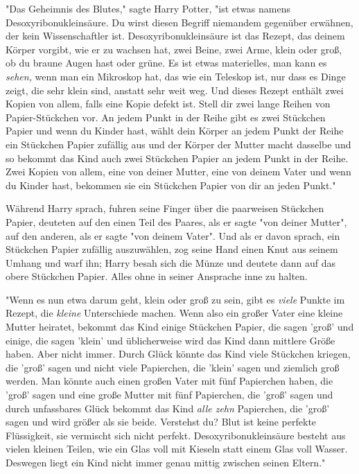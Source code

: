 {"Das Geheimnis des Blutes," sagte Harry Potter, "ist etwas namens Desoxyribonukleinsäure. Du wirst diesen Begriff niemandem gegenüber erwähnen, der kein Wissenschaftler ist. Desoxyribonukleinsäure ist das Rezept, das deinem Körper vorgibt, wie er zu wachsen hat, zwei Beine, zwei Arme, klein oder groß, ob du braune Augen hast oder grüne. Es ist etwas materielles, man kann es \emph{sehen,} wenn man ein Mikroskop hat, das wie ein Teleskop ist, nur dass es Dinge zeigt, die sehr klein sind, anstatt sehr weit weg. Und dieses Rezept enthält zwei Kopien von allem, falls eine Kopie defekt ist. Stell dir zwei lange Reihen von Papier-Stückchen vor. An jedem Punkt in der Reihe gibt es zwei Stückchen Papier und wenn du Kinder hast, wählt dein Körper an jedem Punkt der Reihe ein Stückchen Papier zufällig aus und der Körper der Mutter macht dasselbe und so bekommt das Kind auch zwei Stückchen Papier an jedem Punkt in der Reihe. Zwei Kopien von allem, eine von deiner Mutter, eine von deinem Vater und wenn du Kinder hast, bekommen sie ein Stückchen Papier von dir an jeden Punkt."

Während Harry sprach, fuhren seine Finger über die paarweisen Stückchen Papier, deuteten auf den einen Teil des Paares, als er sagte "von deiner Mutter", auf den anderen, als er sagte "von deinem Vater". Und als er davon sprach, ein Stückchen Papier zufällig auszuwählen, zog seine Hand einen Knut aus seinem Umhang und warf ihn; Harry besah sich die Münze und deutete dann auf das obere Stückchen Papier. Alles ohne in seiner Ansprache inne zu halten.

"Wenn es nun etwa darum geht, klein oder groß zu sein, gibt es \emph{viele} Punkte im Rezept, die \emph{kleine} Unterschiede machen. Wenn also ein großer Vater eine kleine Mutter heiratet, bekommt das Kind einige Stückchen Papier, die sagen 'groß' und einige, die sagen 'klein' und üblicherweise wird das Kind dann mittlere Größe haben. Aber nicht immer. Durch Glück könnte das Kind viele Stückchen kriegen, die 'groß' sagen und nicht viele Papierchen, die 'klein' sagen und ziemlich groß werden. Man könnte auch einen großen Vater mit fünf Papierchen haben, die 'groß' sagen und eine große Mutter mit fünf Papierchen, die 'groß' sagen und durch unfassbares Glück bekommt das Kind \emph{alle zehn} Papierchen, die 'groß' sagen und wird größer als sie beide. Verstehst du? Blut ist keine perfekte Flüssigkeit, sie vermischt sich nicht perfekt. Desoxyribonukleinsäure besteht aus vielen kleinen Teilen, wie ein Glas voll mit Kieseln statt einem Glas voll Wasser. Deswegen liegt ein Kind nicht immer genau mittig zwischen seinen Eltern."

}
